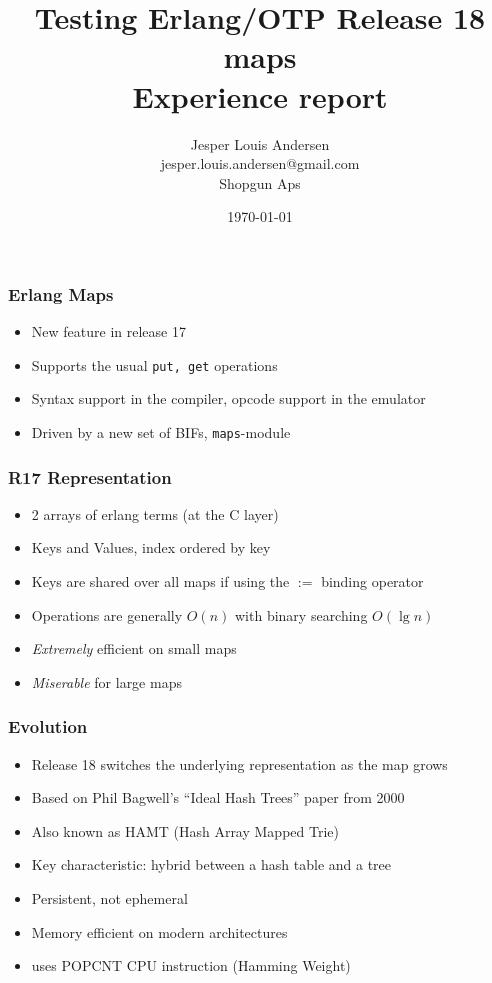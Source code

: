\documentclass[lualatex]{beamer}
\author{Jesper Louis Andersen\\jesper.louis.andersen@gmail.com\\Shopgun Aps}
\date{\today{}}
\title{Testing Erlang/OTP Release 18 maps\\Experience report}
\begin{document}
\maketitle

\begin{frame}
\frametitle{Erlang Maps}
\begin{itemize}
\item New feature in release 17
\item Supports the usual \texttt{put, get} operations
\item Syntax support in the compiler, opcode support in the emulator
\item Driven by a new set of BIFs, \texttt{maps}-module
\end{itemize}
\end{frame}

\begin{frame}
\frametitle{R17 Representation}
\begin{itemize}
\item 2 arrays of erlang terms (at the C layer)
\item Keys and Values, index ordered by key
\item Keys are shared over all maps if using the $:=$ binding operator
\item Operations are generally $O(n)$ with binary searching $O(\lg n)$
\item \emph{Extremely} efficient on small maps
\item \emph{Miserable} for large maps
\end{itemize}
\end{frame}

\begin{frame}
\frametitle{Evolution}
\begin{itemize}
\item Release 18 switches the underlying representation as the map grows
\item Based on Phil Bagwell's ``Ideal Hash Trees'' paper from 2000
\item Also known as HAMT (Hash Array Mapped Trie)
\item Key characteristic: hybrid between a hash table and a tree
\item Persistent, not ephemeral
\item Memory efficient on modern architectures
\item uses POPCNT CPU instruction (Hamming Weight)
\end{itemize}
\end{frame}
\end{document}
